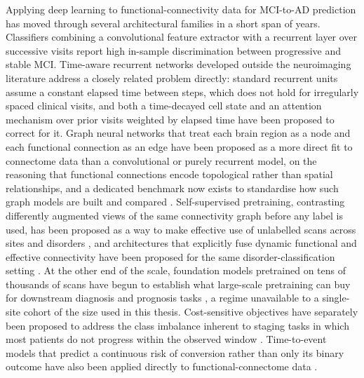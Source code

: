 Applying deep learning to functional-connectivity data for \ac{MCI}-to-\ac{AD} prediction
has moved through several architectural families in a short span of years. Classifiers
combining a convolutional feature extractor with a recurrent layer over successive visits
report high in-sample discrimination between progressive and stable \ac{MCI}. Time-aware
recurrent networks developed outside the neuroimaging literature address a closely related
problem directly: standard recurrent units assume a constant elapsed time between steps,
which does not hold for irregularly spaced clinical visits, and both a time-decayed cell
state \parencite{baytas2017tlstm} and an attention mechanism over prior visits weighted by
elapsed time \parencite{zhang2019attain} have been proposed to correct for it. Graph neural
networks that treat each brain region as a node and each functional connection as an edge
have been proposed as a more direct fit to connectome data than a convolutional or purely
recurrent model, on the reasoning that functional connections encode topological rather
than spatial relationships, and a dedicated benchmark now exists to standardise how such
graph models are built and compared \parencite{cui2023braingb}. Self-supervised
pretraining, contrasting differently augmented views of the same connectivity graph before
any label is used, has been proposed as a way to make effective use of unlabelled scans
across sites and disorders \parencite{wang2023ucgl,wang2025gcda}, and architectures that
explicitly fuse dynamic functional and effective connectivity have been proposed for the
same disorder-classification setting \parencite{chen2024knosys}. At the other end of the
scale, foundation models pretrained on tens of thousands of scans have begun to establish
what large-scale pretraining can buy for downstream diagnosis and prognosis tasks
\parencite{dong2024brainjepa}, a regime unavailable to a single-site cohort of the size
used in this thesis. Cost-sensitive objectives have separately been proposed to address the
class imbalance inherent to staging tasks in which most patients do not progress within
the observed window \parencite{hu2024cswcl}. Time-to-event models that predict a
continuous risk of conversion rather than only its binary outcome have also been applied
directly to functional-connectome data \parencite{kim2024prognostic}.

